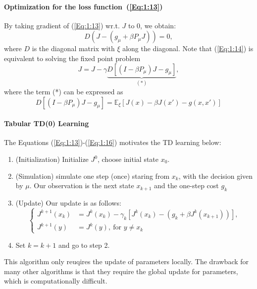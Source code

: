 \paragraph{Optimization for the loss function~(\ref{Eq:1:13})}
By taking gradient of (\ref{Eq:1:13}) wr.t. $J$ to $0$, we obtain:
\begin{equation}\label{Eq:1:14}
D(J - (g_\mu+\beta P_\mu J))=0,
\end{equation}
where $D$ is the diagonal matrix with $\xi$ along the diagonal.
Note that (\ref{Eq:1:14}) is equivalent to solving the fixed point problem
\begin{equation}
J = J - \gamma \underbrace{D[(I-\beta P_\mu) J - g_\mu]}_{(*)},
\end{equation}
where the term (*) can be expressed as
\begin{equation}\label{Eq:1:16}
D[(I-\beta P_\mu) J - g_\mu] = \mathbb{E}_\xi\left[J(x) - \beta J(x') - g(x,x')\right]
\end{equation}

\paragraph{Tabular TD(0) Learning}
The Equations (\ref{Eq:1:13})-(\ref{Eq:1:16}) motivates the TD learning below:
\begin{enumerate}
\item
(Initialization) Initialize $J^0$, choose initial state $x_0$.
\item
(Simulation) simulate one step (once) staring from $x_k$, with the decision given by $\mu$. Our observation is the next state $x_{k+1}$ and the one-step cost $g_k$
\item
(Update) Our update is as follows:
\begin{equation}
\left\{
\begin{aligned}
J^{k+1}(x_k)&=J^k(x_k) - \gamma_k\left[ J^k(x_k) -  (g_k + \beta J^k(x_{k+1}))\right],\\
J^{k+1}(y) &= J^k(y), \ \text{for }y\ne x_k
\end{aligned}
\right.
\end{equation}
\item
Set $k=k+1$ and go to step 2.
\end{enumerate}
\begin{remark}
This algorithm only reuqires the update of parameters locally. The drawback for many other algorithms is that they require the global update for parameters, which is computationally difficult.
\end{remark}

